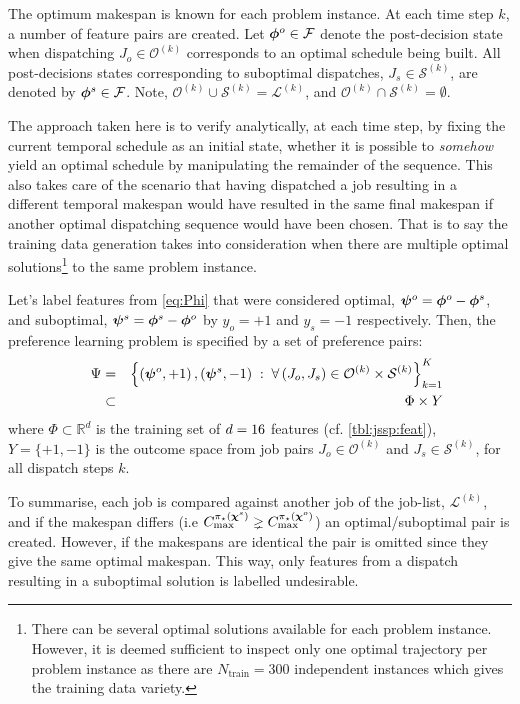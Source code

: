 \documentclass[twocolumn]{svjour3}
\begin{document}
The optimum makespan is known for each problem instance. At each time step $k$, 
a number of feature pairs are created. 
Let $\bm{\phi}^{o}\in\mathcal{F}$ denote the post-decision state when dispatching 
$J_o\in\mathcal{O}^{(k)}$ corresponds to an optimal schedule being built. 
All post-decisions states corresponding to suboptimal dispatches, 
$J_s\in\mathcal{S}^{(k)}$, are denoted by $\bm{\phi}^{s}\in\mathcal{F}$.
Note, \mbox{$\mathcal{O}^{(k)}\cup\mathcal{S}^{(k)}=\mathcal{L}^{(k)}$}, and 
\mbox{$\mathcal{O}^{(k)}\cap\mathcal{S}^{(k)}=\emptyset$}.

The approach taken here is to verify analytically, at each time step, by fixing 
the current temporal schedule as an initial state, whether it is possible to 
\emph{somehow} yield an optimal schedule by manipulating the remainder of the 
sequence. This also takes care of the scenario that having dispatched a job 
resulting in a different temporal makespan would have resulted in the same 
final makespan if another optimal dispatching sequence would have been chosen. 
That is to say the training data generation takes into consideration when there 
are multiple optimal solutions\footnote{
There can be several optimal solutions available for each problem instance. 
However, it is deemed sufficient to inspect only one optimal trajectory per 
problem instance as there are $N_{\text{train}}=300$ independent instances 
which gives the training data variety.} 
to the same problem instance. 

Let's label features from \cref{eq:Phi} that were considered optimal, 
\mbox{$\bm \psi^{o}=\bm{\phi}^{o}-\bm{\phi}^{s}$}, and suboptimal, 
\mbox{$\bm \psi^{s}=\bm{\phi}^{s}-\bm{\phi}^{o}$} by $y_o=+1$ and $y_s=-1$ respectively.  
Then, the preference learning problem is specified by a set of preference pairs:
\begin{eqnarray}
\quad \Psi &=& 
\left\{\left(\bm \psi^o,+1\right),\left(\bm \psi^s,-1\right)
\;:\;
\forall \left(J_o,J_s\right) \in \mathcal{O}^{(k)} \times 
\mathcal{S}^{(k)}\right\}_{k=1}^{K} \nonumber
\\ &\subset& \Phi\times Y \label{eq:prefset}
\end{eqnarray}
where $\Phi\subset \mathbb{R}^d$ is the training set of $d=16$ 
features (cf. \cref{tbl:jssp:feat}), $Y=\{+1,-1\}$ is the outcome space from 
job pairs $J_o\in\mathcal{O}^{(k)}$ and $J_s\in\mathcal{S}^{(k)}$, for all 
dispatch steps $k$.

To summarise, each job is compared against another job of the job-list, 
$\mathcal{L}^{(k)}$, and if the makespan differs (i.e 
$C_{\max}^{\pi_\star(\bm \chi^s)} \gneq C_{\max}^{\pi_\star(\bm \chi^o)}$) an 
optimal/suboptimal pair is created. 
However, if the makespans are identical the pair is omitted since they give the 
same optimal makespan. 
This way, only features from a dispatch resulting in a suboptimal solution is 
labelled undesirable.
\end{document}
